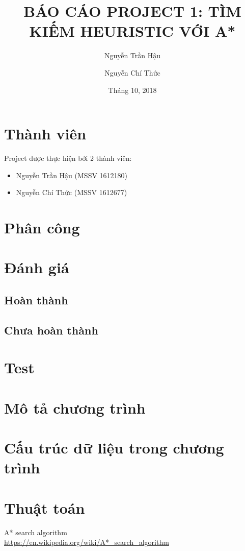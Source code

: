 \documentclass[12pt]{article}
\title{BÁO CÁO PROJECT 1: TÌM KIẾM HEURISTIC VỚI A*}
\author{Nguyễn Trần Hậu \and
Nguyễn Chí Thức}
\date{Tháng 10, 2018}
\begin{document}
\maketitle
\newpage
\tableofcontents
\newpage

\section{Thành viên}
Project được thực hiện bởi 2 thành viên:
\begin{itemize}
\item Nguyễn Trần Hậu (MSSV 1612180)
\item Nguyễn Chí Thức (MSSV 1612677)
\end{itemize}

\section{Phân công}

\section{Đánh giá}

\subsection{Hoàn thành}

\subsection{Chưa hoàn thành}

\section{Test}

\section{Mô tả chương trình}

\section{Cấu trúc dữ liệu trong chương trình}

\section{Thuật toán}

\begin{thebibliography}{1}
 A* search algorithm \\
\url{https://en.wikipedia.org/wiki/A*_search_algorithm}
\end{thebibliography}
\end{document}
